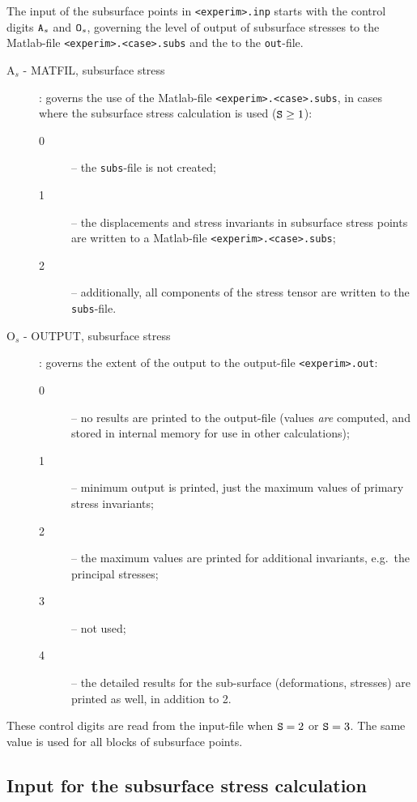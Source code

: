 \documentclass[12pt]{report}
\begin{document}
The input of the subsurface points in {\tt <experim>.inp} starts with the
control digits ${\tt A}_s$ and ${\tt O}_s$, governing the level of output of
subsurface stresses to the Matlab-file {\tt <experim>.<case>.subs} and
the to the {\tt out}-file.
\begin{description}
\item[A$_s$ - MATFIL, subsurface stress] : governs the use of the Matlab-file
        {\tt <expe\-rim>.\-<case>\-.subs}, in cases where the subsurface
        stress calculation is used (${\tt S}\ge 1$):
\begin{description}
\item[0] -- the {\tt subs}-file is not created;
\item[1] -- the displacements and stress invariants in subsurface stress
        points are written to a Matlab-file {\tt <experim>.<case>.subs};
\item[2] -- additionally, all components of the stress tensor are written to
        the {\tt subs}-file.
\end{description}

\item[O$_s$ - OUTPUT, subsurface stress] : governs the extent of the output to
        the output-file {\tt <experim>\-.out}:
\begin{description}
\item[0] -- no results are printed to the output-file (values {\em are\/}
        computed, and stored in internal memory for use in other calculations);
\item[1] -- minimum output is printed, just the maximum values of primary
        stress invariants;
\item[2] -- the maximum values are printed for additional invariants, e.g.\
        the principal stresses;
\item[3] -- not used;
\item[4] -- the detailed results for the sub-surface (deformations, stresses)
        are printed as well, in addition to 2.
\end{description}
\end{description}
These control digits are read from the input-file when ${\tt S}=2$ or ${\tt
S}=3$. The same value is used for all blocks of subsurface points.

\subsection{Input for the subsurface stress calculation}
\label{sec:subsurf_inp}
\end{document}
